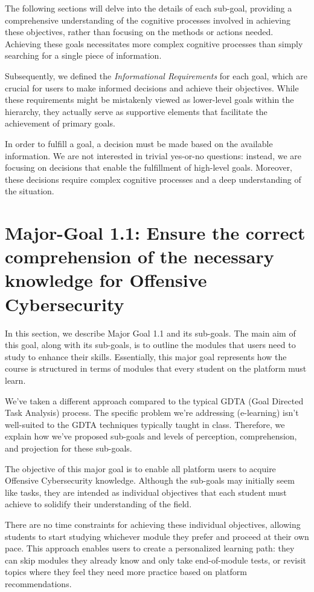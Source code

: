 The following sections will delve into the details of each sub-goal, providing a comprehensive understanding of the cognitive processes involved in achieving these objectives, rather than focusing on the methods or actions needed.
Achieving these goals necessitates more complex cognitive processes than simply searching for a single piece of information.

Subsequently, we defined the \textit{Informational Requirements} for each goal, which are crucial for users to make informed decisions and achieve their objectives. While these requirements might be mistakenly viewed as lower-level goals within the hierarchy, they actually serve as supportive elements that facilitate the achievement of primary goals.

In order to fulfill a goal, a decision must be made based on the available information. We are not interested in trivial yes-or-no questions: instead, we are focusing on decisions that enable the fulfillment of high-level goals. Moreover, these decisions require complex cognitive processes and a deep understanding of the situation.

\newpage
\section{Major-Goal 1.1: Ensure the correct comprehension of the necessary knowledge for Offensive Cybersecurity}
In this section, we describe Major Goal 1.1 and its sub-goals.
The main aim of this goal, along with its sub-goals, is to outline the modules that users need to study to enhance their skills. Essentially, this major goal represents how the course is structured in terms of modules that every student on the platform must learn.

We've taken a different approach compared to the typical GDTA (Goal Directed Task Analysis) process. The specific problem we're addressing (e-learning) isn't well-suited to the GDTA techniques typically taught in class. Therefore, we explain how we've proposed sub-goals and levels of perception, comprehension, and projection for these sub-goals.

The objective of this major goal is to enable all platform users to acquire Offensive Cybersecurity knowledge. Although the sub-goals may initially seem like tasks, they are intended as individual objectives that each student must achieve to solidify their understanding of the field. 

There are no time constraints for achieving these individual objectives, allowing students to start studying whichever module they prefer and proceed at their own pace. This approach enables users to create a personalized learning path: they can skip modules they already know and only take end-of-module tests, or revisit topics where they feel they need more practice based on platform recommendations.

